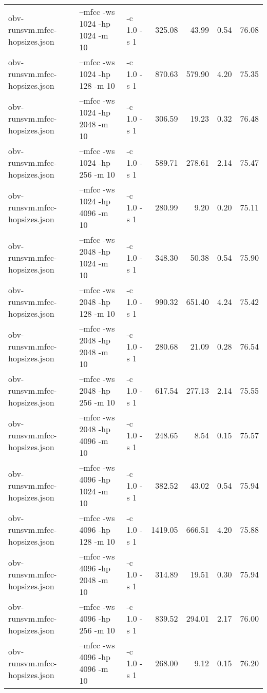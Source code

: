 \documentclass[11pt,a4paper]{article}
\begin{document}
\begin{tabular}{lllrrrr}
 obv-runsvm.mfcc-hopsizes.json  &  --mfcc -ws 1024  -hp 1024  -m 10  &  -c 1.0 -s 1  &   325.08  &   43.99  &  0.54  &  76.08  \\
 obv-runsvm.mfcc-hopsizes.json  &  --mfcc -ws 1024  -hp 128   -m 10  &  -c 1.0 -s 1  &   870.63  &  579.90  &  4.20  &  75.35  \\
 obv-runsvm.mfcc-hopsizes.json  &  --mfcc -ws 1024  -hp 2048  -m 10  &  -c 1.0 -s 1  &   306.59  &   19.23  &  0.32  &  76.48  \\
 obv-runsvm.mfcc-hopsizes.json  &  --mfcc -ws 1024  -hp 256   -m 10  &  -c 1.0 -s 1  &   589.71  &  278.61  &  2.14  &  75.47  \\
 obv-runsvm.mfcc-hopsizes.json  &  --mfcc -ws 1024  -hp 4096  -m 10  &  -c 1.0 -s 1  &   280.99  &    9.20  &  0.20  &  75.11  \\
 obv-runsvm.mfcc-hopsizes.json  &  --mfcc -ws 2048  -hp 1024  -m 10  &  -c 1.0 -s 1  &   348.30  &   50.38  &  0.54  &  75.90  \\
 obv-runsvm.mfcc-hopsizes.json  &  --mfcc -ws 2048  -hp 128   -m 10  &  -c 1.0 -s 1  &   990.32  &  651.40  &  4.24  &  75.42  \\
 obv-runsvm.mfcc-hopsizes.json  &  --mfcc -ws 2048  -hp 2048  -m 10  &  -c 1.0 -s 1  &   280.68  &   21.09  &  0.28  &  76.54  \\
 obv-runsvm.mfcc-hopsizes.json  &  --mfcc -ws 2048  -hp 256   -m 10  &  -c 1.0 -s 1  &   617.54  &  277.13  &  2.14  &  75.55  \\
 obv-runsvm.mfcc-hopsizes.json  &  --mfcc -ws 2048  -hp 4096  -m 10  &  -c 1.0 -s 1  &   248.65  &    8.54  &  0.15  &  75.57  \\
 obv-runsvm.mfcc-hopsizes.json  &  --mfcc -ws 4096  -hp 1024  -m 10  &  -c 1.0 -s 1  &   382.52  &   43.02  &  0.54  &  75.94  \\
 obv-runsvm.mfcc-hopsizes.json  &  --mfcc -ws 4096  -hp 128   -m 10  &  -c 1.0 -s 1  &  1419.05  &  666.51  &  4.20  &  75.88  \\
 obv-runsvm.mfcc-hopsizes.json  &  --mfcc -ws 4096  -hp 2048  -m 10  &  -c 1.0 -s 1  &   314.89  &   19.51  &  0.30  &  75.94  \\
 obv-runsvm.mfcc-hopsizes.json  &  --mfcc -ws 4096  -hp 256   -m 10  &  -c 1.0 -s 1  &   839.52  &  294.01  &  2.17  &  76.00  \\
 obv-runsvm.mfcc-hopsizes.json  &  --mfcc -ws 4096  -hp 4096  -m 10  &  -c 1.0 -s 1  &   268.00  &    9.12  &  0.15  &  76.20  \\

\end{tabular}
\end{document}
